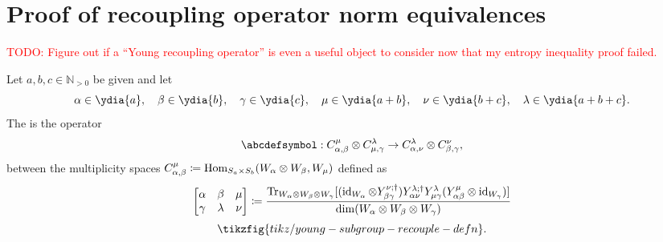 \documentclass[notitlepage, 10pt]{article}
\begin{document}
\clearpage
\section{Proof of recoupling operator norm equivalences}
\label{sec:recouple_norms}

\textcolor{red}{TODO: Figure out if a ``Young recoupling operator'' is even a useful object to consider now that my entropy inequality proof failed.}
\begin{defn}
    \label{defn:young_recouple}
    Let $a,b,c \in \mathbb N_{>0}$ be given and let 
    \begin{equation}
        \alpha \in \ydia{a},\quad \beta \in \ydia{b},\quad \gamma \in \ydia{c},\quad
        \mu \in \ydia{a+b},\quad \nu \in \ydia{b+c},\quad \lambda \in \ydia{a+b+c}.
    \end{equation}
    The  is the operator
    \begin{equation}
        \abcdefsymbol
        :
        C^{\mu}_{\alpha,\beta} \ot C^{\lambda}_{\mu,\gamma} \to C^{\lambda}_{\alpha, \nu} \ot C^{\nu}_{\beta,\gamma},
    \end{equation}
    between the multiplicity spaces $C^{\mu}_{\alpha,\beta} \coloneqq \operatorname{Hom}_{S_a\times S_b}(W_{\alpha}\otimes W_{\beta}, W_{\mu})$ defined as
    \begin{equation}
        \begin{bmatrix}\alpha & \beta & \mu \\ \gamma & \lambda & \nu \end{bmatrix}
        \coloneqq
        \frac{
            \operatorname{Tr}_{W_{\alpha}\otimes W_{\beta}\otimes W_{\gamma}}[(\operatorname{id}_{W_{\alpha}}\otimes Y_{\beta\gamma}^{\nu;\dagger})
            Y_{\alpha\nu}^{\lambda;\dagger}
            Y_{\mu\gamma}^{\lambda}
            (Y_{\alpha\beta}^{\mu}\otimes\operatorname{id}_{W_{\gamma}})]
        }{\dim(W_{\alpha}\otimes W_{\beta}\otimes W_{\gamma})}
    \end{equation}
    \begin{equation}
        \tikzfig{tikz/young-subgroup-recouple-defn}.
    \end{equation}
\end{defn}
\end{document}
